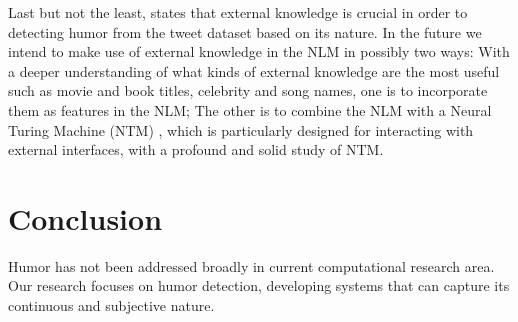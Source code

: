 \documentclass[11pt,a4paper]{article}
\begin{document}
Last but not the least, \cite{2016hashtagwars} states that 
external knowledge is crucial in order to detecting humor from 
the tweet dataset based on its nature. In the future we intend 
to make use of external knowledge in the NLM in possibly two 
ways: With a deeper understanding of what kinds of external 
knowledge are the most useful such as movie and book titles, 
celebrity and song names, one is to incorporate them as features 
in the NLM; The other is to combine the NLM with a Neural 
Turing Machine (NTM) \cite{graves2014neural}, which is particularly 
designed for interacting with external interfaces, with a 
profound and solid study of NTM.

\section{Conclusion}

Humor has not been addressed broadly in current computational 
research area. Our research focuses on humor detection, developing 
systems that can capture its continuous and subjective nature. 
 
%
%


\end{document}
